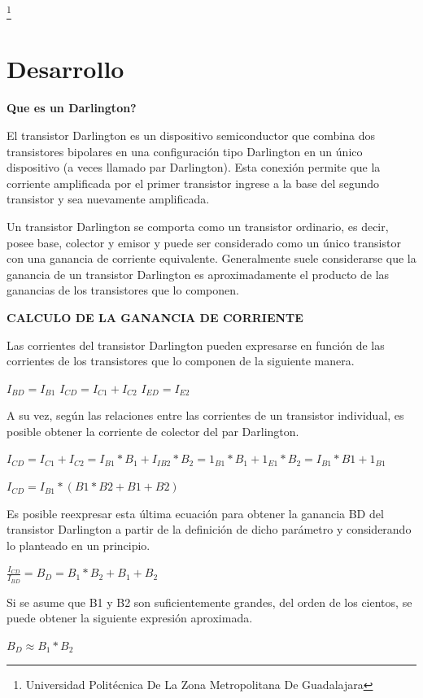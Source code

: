 \documentclass[11pt,a4paper]{article}
\begin{document}
\footnote{Universidad Politécnica De La Zona Metropolitana De Guadalajara} 

\newpage

\section{Desarrollo}

\textbf{Que es un Darlington?
}

El transistor Darlington es un dispositivo semiconductor que combina dos transistores bipolares en una configuración tipo Darlington en un único dispositivo (a veces llamado par Darlington). Esta conexión permite que la corriente amplificada por el primer transistor ingrese a la base del segundo transistor y sea nuevamente amplificada.

Un transistor Darlington se comporta como un transistor ordinario, es decir, posee base, colector y emisor y puede ser considerado como un único transistor con una ganancia de corriente equivalente. Generalmente suele considerarse que la ganancia de un transistor Darlington es aproximadamente el producto de las ganancias de los transistores que lo componen. 

\textbf{CALCULO DE LA GANANCIA DE CORRIENTE}

Las corrientes del transistor Darlington pueden expresarse en función de las corrientes de los transistores que lo componen de la siguiente manera. 

$ I_{BD} = I_{B1} $
$ I_{CD} = I_{C1} + I_{C2} $
$ I_{ED} = I_{E2} $

A su vez, según las relaciones entre las corrientes de un transistor individual, es posible obtener la corriente de colector del par Darlington. 

$ I_{CD} = I_{C1} + I_{C2} = I_{B1} * B_1 + I_{IB2} * B_2 = 1_{B1} * B_1 + 1_{E1} * B_2 = I_{B1} * B1 + 1_{B1}$

$ I_{CD} = I_{B1} * (B1 * B2 + B1 + B2)  $

Es posible reexpresar esta última ecuación para obtener la ganancia BD del transistor Darlington a partir de la definición de dicho parámetro y considerando lo planteado en un principio. 

$ \frac{I_{CD}}{I_{BD}} = B_D = B_1 * B_2 + B_1 + B_2 $

Si se asume que B1 y B2 son suficientemente grandes, del orden de los cientos, se puede obtener la siguiente expresión aproximada. 

$ B_D \approx B_1 * B_2 $
\end{document}
